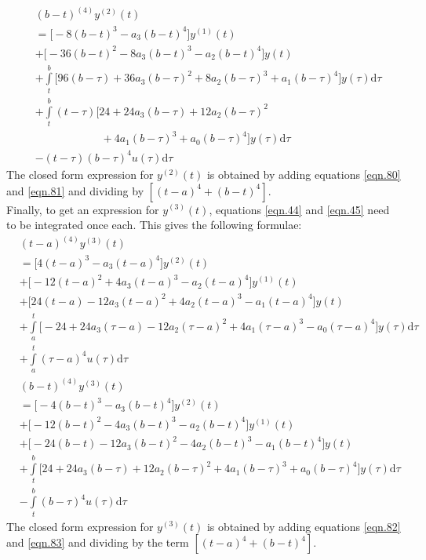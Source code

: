 \documentclass{article}
\begin{document}
\begin{equation}\label{eqn.81}
\begin{split}
	&(b-t)^{(4)}y^{(2)}(t)\\
	&=\bigg[-8(b-t)^{3}-a_3(b-t)^{4}\bigg]y^{(1)}(t)\\&+\bigg[-36(b-t)^{2}-8a_3(b-t)^{3}-a_2(b-t)^{4}\bigg]y(t)\\
	&+\int\limits_{t}^{b}\bigg[96(b-\tau)+36a_3(b-\tau)^{2}+8a_2(b-\tau)^{3}+a_1(b-\tau)^{4}\bigg]y(\tau)\mathrm{d}\tau\\
	&+\int\limits_{t}^{b}(t-\tau)\bigg[24+24a_3(b-\tau)+12a_2(b-\tau)^{2}
	\\&\qquad\qquad\qquad{}+4a_1(b-\tau)^{3}+a_0(b-\tau)^{4}\bigg]y(\tau)\mathrm{d}\tau\\
	&-(t-\tau)(b-\tau)^{4}u(\tau)\mathrm{d}\tau
\end{split}
\end{equation}
The closed form expression for $y^{(2)}(t)$ is obtained by adding equations \eqref{eqn.80} and \eqref{eqn.81} and dividing by $[(t-a)^{4}+(b-t)^{4}]$.\\
Finally, to get an expression for $y^{(3)}(t)$, equations \eqref{eqn.44} and \eqref{eqn.45} need to be integrated once each. This gives the following formulae:
\begin{equation}\label{eqn.82}
\begin{split}
	&(t-a)^{(4)}y^{(3)}(t)\\
	&=\bigg[4(t-a)^{3} - a_3(t-a)^{4}\bigg]y^{(2)}(t)\\
	&+\bigg[-12(t-a)^{2}+4a_3(t-a)^{3}-a_2(t-a)^{4}\bigg]y^{(1)}(t)\\
	&+\bigg[24(t-a)-12a_3(t-a)^{2}+4a_2(t-a)^{3}-a_1(t-a)^{4}\bigg]y(t)\\
	&+\int\limits_{a}^{t}\bigg[-24+24a_3(\tau-a)-12a_2(\tau-a)^{2}+4a_1(\tau-a)^{3}-a_0(\tau-a)^{4}\bigg]y(\tau)\mathrm{d}\tau\\
	&+\int\limits_{a}^{t}(\tau-a)^{4}u(\tau)\mathrm{d}\tau
\end{split}
\end{equation}
\begin{equation}\label{eqn.83}
\begin{split}
	&(b-t)^{(4)}y^{(3)}(t)\\
	&=\bigg[-4(b-t)^{3} - a_3(b-t)^{4}\bigg]y^{(2)}(t)\\
	&+\bigg[-12(b-t)^{2}-4a_3(b-t)^{3}-a_2(b-t)^{4}\bigg]y^{(1)}(t)\\
	&+\bigg[-24(b-t)-12a_3(b-t)^{2}-4a_2(b-t)^{3}-a_1(b-t)^{4}\bigg]y(t)\\
	&+\int\limits_{t}^{b}\bigg[24+24a_3(b-\tau)+12a_2(b-\tau)^{2}+4a_1(b-\tau)^{3}+a_0(b-\tau)^{4}\bigg]y(\tau)\mathrm{d}\tau\\
	&-\int\limits_{t}^{b}(b-\tau)^{4}u(\tau)\mathrm{d}\tau
\end{split}
\end{equation}
The closed form expression for $y^{(3)}(t)$ is obtained by adding equations \eqref{eqn.82} and \eqref{eqn.83} and dividing by the term $[(t-a)^{4}+(b-t)^{4}]$.\\
\end{document}
